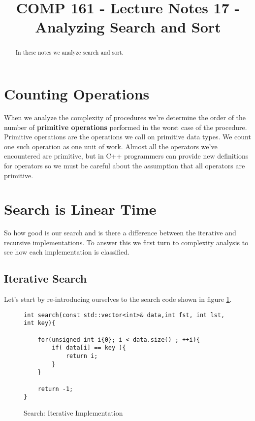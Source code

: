 \documentclass[]{tufte-handout}
\title{COMP 161 - Lecture Notes 17 - Analyzing Search and Sort}
\date{}
\begin{document}
 
\maketitle

\begin{abstract}
In these notes we analyze search and sort. 
\end{abstract}

\section{Counting Operations}

When we analyze the complexity of procedures we're determine the order of the number of \textbf{primitive operations} performed in the worst case of the procedure. Primitive operations are the operations we call on primitive data types. We count one such operation as one unit of work. Almost all the operators we've encountered are primitive, but in C++ programmers can provide new definitions for operators so we must be careful about the assumption that all operators are primitive. 

\section{Search is Linear Time}

So how good is our search and is there a difference between the iterative and recursive implementations. To answer this we first turn to complexity analysis to see how each implementation is classified. 

\subsection{Iterative Search}

Let's start by re-introducing ourselves to the search code shown in figure \ref{code:searchiter}.
\begin{figure}[htpb!]
\begin{lstlisting}
int search(const std::vector<int>& data,int fst, int lst, int key){

    for(unsigned int i{0}; i < data.size() ; ++i){
    	if( data[i] == key ){
			return i;
		}
    }

    return -1;
}
\end{lstlisting}
\label{code:searchiter}
\caption{Search: Iterative Implementation}
\end{figure}
\end{document}

